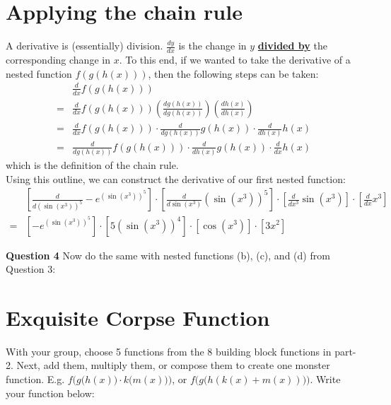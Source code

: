 \documentclass{article}
\begin{document}
\pagebreak

\section{Applying the chain rule}
\noindent A derivative is (essentially) division. $\frac{dy}{dx}$ is the change in $y$ \underline{\textbf{divided by}} the corresponding change in $x$. To this end, if we wanted to take the derivative of a nested function $f(g(h(x)))$, then the following steps can be taken:
\begin{align}
    &\frac{d}{dx}f(g(h(x))) \\
    =& \frac{d}{dx}f(g(h(x)))\left(\frac{dg(h(x))}{dg(h(x))}\right)\left(\frac{dh(x)}{dh(x)}\right) \\
    =& \frac{d}{dx}f(g(h(x)))\cdot\frac{d}{dg(h(x))}g(h(x))\cdot \frac{d}{dh(x)}h(x) \\
    =& \frac{d}{dg(h(x))}f(g(h(x)))\cdot\frac{d}{dh(x)}g(h(x))\cdot \frac{d}{dx}h(x)
\end{align}
which is the definition of the chain rule.
\\
Using this outline, we can construct the derivative of our first nested function:
\begin{align*}
&\left[\frac{d}{d(\sin(x^{3}))^{5}}-e^{(\sin(x^{3}))^{5}}\right] \cdot \left[\frac{d}{d\sin(x^{3})}(\sin(x^{3}))^{5}\right] \cdot \left[\frac{d}{dx^{3}}\sin(x^{3})\right] \cdot \left[\frac{d}{dx}x^{3}\right] \\
=&\left[-e^{(\sin(x^{3}))^{5}}\right] \cdot \left[5(\sin(x^{3}))^{4}\right] \cdot \left[\cos(x^{3})\right] \cdot \left[3x^{2}\right]
\end{align*}

\vspace{.5cm}

\noindent \textbf{Question 4}
Now do the same with nested functions (b), (c), and (d) from Question 3:

\pagebreak

\section{Exquisite Corpse Function}
\noindent With your group, choose 5 functions from the 8 building block functions in part-2. Next, add them, multiply them, or compose them to create one monster function. E.g. $f\Big(g\big(h(x)\big)\cdot k\big(m(x)\big)\Big)$, or $f\Big(g\big(h(k(x)+m(x))\big)\Big)$. Write your function below:\\
\vspace{3cm}
\end{document}
